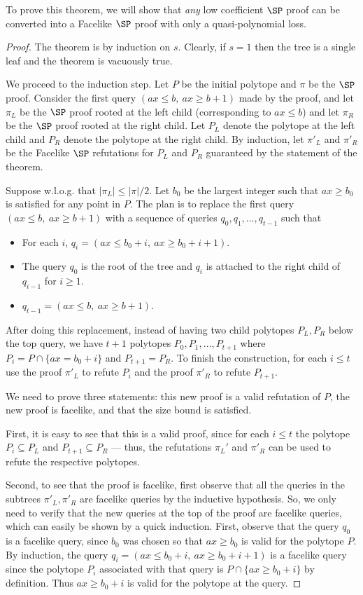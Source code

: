 To prove this theorem, we will show that \emph{any} low coefficient $\SP$ proof can be converted into a Facelike $\SP$ proof with only a quasi-polynomial loss. 
\begin{proof}
	The theorem is by induction on $s$. Clearly, if $s=1$ then the tree is a single leaf and the theorem is vacuously true.
	
	We proceed to the induction step. Let $P$ be the initial polytope and $\pi$ be the $\SP$ proof. Consider the first query $(ax \leq b, ~ax \geq b+1)$ made by the proof, and let $\pi_L$ be the $\SP$ proof rooted at the left child (corresponding to $ax \leq b$) and let $\pi_R$ be the $\SP$ proof rooted at the right child. Let $P_L$ denote the polytope at the left child and $P_R$ denote the polytope at the right child. By induction, let $\pi'_L$ and $\pi'_R$ be the Facelike $\SP$ refutations for $P_L$ and $P_R$ guaranteed by the statement of the theorem.
	
	Suppose w.l.o.g. that $|\pi_L| \leq |\pi|/2$. Let $b_0$ be the largest integer such that $ax \geq b_0$ is satisfied for any point in $P$. The plan is to replace the first query $(ax \leq b, ~ax \geq b+1)$ with a sequence of queries $q_0, q_1, \ldots, q_{t-1}$ such that
	\begin{itemize}
		\item For each $i$, $q_i =(ax \leq b_0+i,~ax \geq b_0+i+1)$.
		\item The query $q_0$ is the root of the tree and $q_i$ is attached to the right child of $q_{i-1}$ for $i \geq 1$.
		\item $q_{t-1} = (ax \leq b,~ax \geq b+1)$.
	\end{itemize}
	After doing this replacement, instead of having two child polytopes $P_L, P_R$ below the top query, we have $t+1$ polytopes $P_0,P_1,\ldots,P_{t+1}$ where $P_i = P \cap \{ax =b_0 +i\}$ and $P_{t+1} = P_R$. To finish the construction, for each $i \leq t$ use the proof $\pi'_L$ to refute $P_i$ and the proof $\pi'_R$ to refute $P_{t+1}$. 
	
	We need to prove three statements: this new proof is a valid refutation of $P$, the new proof is facelike, and that the size bound is satisfied. 
	
	First, it is easy to see that this is a valid proof, since for each $i \leq t$ the polytope $P_i \subseteq P_L$ and $P_{t+1} \subseteq P_R$ --- thus, the refutations $\pi_L'$ and $\pi'_R$ can be used to refute the respective polytopes. 
	
	Second, to see that the proof is facelike, first observe that all the queries in the subtrees $\pi'_L, \pi'_R$ are facelike queries by the inductive hypothesis. 
	So, we only need to verify that the new queries at the top of the proof are facelike queries, which can easily be shown by a quick induction. First, observe that the query $q_0$ is a facelike query, since $b_0$ was chosen so that $ax \geq b_0$ is valid for the polytope $P$. 
	By induction, the query $q_i = (ax \leq b_0 + i, ~ax \geq b_0 + i+1)$ is a facelike query since the polytope $P_i$ associated with that query is $P \cap \{ax \geq b_0 + i\}$ by definition. Thus $ax \geq b_0 + i$ is valid for the polytope at the query.
	

\end{proof}
